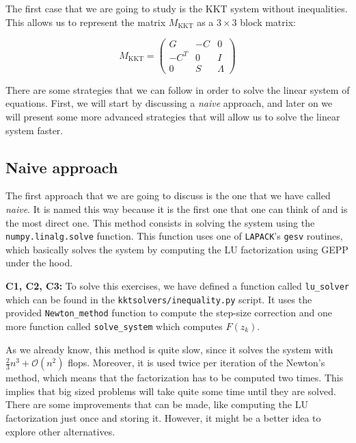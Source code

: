 \documentclass[11pt,a4paper]{article}
\begin{document}
The first case that we are going to study is the KKT system without inequalities.
This allows us to represent the matrix $M_{\text{KKT}}$ as a $3 \times 3$ block
matrix:

\begin{equation}
  \label{eq:3x3-kkt}
  M_{\text{KKT}} =
  \begin{pmatrix}
    G & -C & 0 \\
    -C^T & 0 & I \\
    0 & S & \Lambda
  \end{pmatrix}
\end{equation}

There are some strategies that we can follow in order to solve the linear system of
equations. First, we will start by discussing a \textit{naive} approach, and later on we will present
some more advanced strategies that will allow us to solve the linear system faster.

\subsection{Naive approach}

The first approach that we are going to discuss is the one that we have called \textit{naive}. It
is named this way because it is the first one that one can think of and is the most direct one.
This method consists in solving the system using the \texttt{numpy.linalg.solve} function.
This function uses one of \texttt{LAPACK}'s \texttt{gesv} routines, which basically solves the system
by computing the LU factorization using GEPP under the hood.

\noindent \textbf{C1, C2, C3:} To solve this exercises, we have defined a function called
\texttt{lu\_solver} which can be found in the \texttt{kktsolvers/inequality.py} script.
It uses the provided \texttt{Newton\_method} function to compute the step-size correction
and one more function called \texttt{solve\_system} which computes $F(z_k)$.

As we already know, this method is quite slow, since it solves the system with $\frac{2}{3}n^3 + \mathcal{O}(n^2)$
flops. Moreover, it is used twice per iteration of the Newton's method, which means that
the factorization has to be computed two times. This implies that big sized problems will take
quite some time until they are solved. There are some improvements that can be made, like computing
the LU factorization just once and storing it. However, it might be a better idea to explore
other alternatives.
\end{document}
